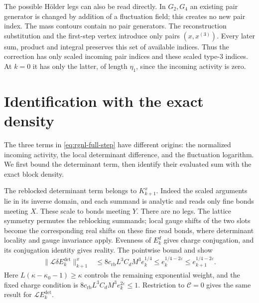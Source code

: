 The possible H\"older legs can also be read directly.
In $G_2,G_4$ an existing pair generator is changed by
addition of a fluctuation field; this creates no new
pair index. The mass contours contain no pair
generators. The reconstruction substitution and the
first-step vertex introduce only pairs $(x,x^{(3)})$.
Every later sum, product and integral preserves this
set of available indices. Thus the correction has
only scaled incoming pair indices and these scaled
type-$3$ indices. At $k=0$ it has only the latter,
of length $\eta_1$, since the incoming activity is zero.

\section{Identification with the exact density}
\label{subsec:rgnl-current-step}

The three terms in \eqref{eq:rgnl-full-step} have different origins:
the normalized incoming activity, the local determinant difference,
and the fluctuation logarithm. We first bound the determinant term,
then identify their evaluated sum with the exact block density.

The reblocked determinant term belongs to $K_{k+1}^x$.
Indeed the scaled arguments lie in its inverse domain,
and each summand is analytic and reads only fine
bonds meeting $X$. These scale to bonds meeting $Y$.
There are no legs. The lattice symmetry permutes the
reblocking summands; local gauge shifts of the two
slots become the corresponding real shifts on these
fine read bonds, where determinant locality and gauge
invariance apply. Evenness of $E_k^d$ gives charge
conjugation, and its conjugation identity gives reality.
The pointwise bound
 and
 show
\begin{align}
 \|\mathcal L\delta E_k^{\mathrm{det}}\|_{k+1}^x
    &\le8c_{\mathrm{rb}}L^3C_dM^3e_k^{1/4}
      \le e_k^{1/4-2\varepsilon}
      \le e_{k+1}^{1/4-2\varepsilon}.
                                      \label{eq:rgnl-reblocked-determinant}
\end{align}
Here $L(\kappa-\kappa_0-1)\ge\kappa$ controls the
remaining exponential weight, and the fixed charge
condition is
$8c_{\mathrm{rb}}L^3C_dM^3e_k^{2\varepsilon}\le1$.
Restriction to $\mathscr C=0$ gives the same result
for $\mathcal LE_k^{\mathrm{det}}$.

